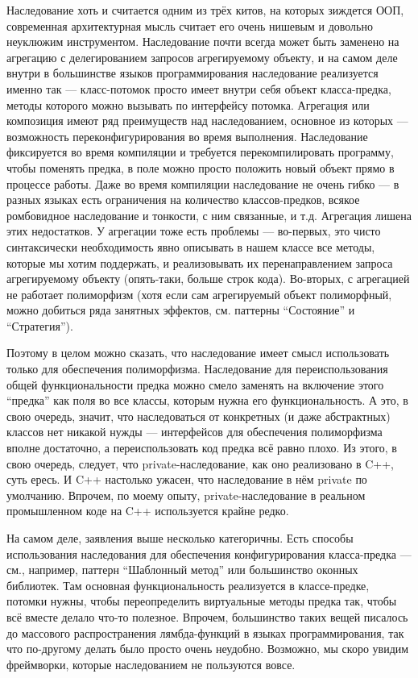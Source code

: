 \documentclass{../../text-style}
\begin{document}
Наследование хоть и считается одним из трёх китов, на которых зиждется ООП, современная архитектурная мысль считает его очень нишевым и довольно неуклюжим инструментом. Наследование почти всегда может быть заменено на агрегацию с делегированием запросов агрегируемому объекту, и на самом деле внутри в большинстве языков программирования наследование реализуется именно так --- класс-потомок просто имеет внутри себя объект класса-предка, методы которого можно вызывать по интерфейсу потомка. Агрегация или композиция имеют ряд преимуществ над наследованием, основное из которых --- возможность переконфигурирования во время выполнения. Наследование фиксируется во время компиляции и требуется перекомпилировать программу, чтобы поменять предка, в поле можно просто положить новый объект прямо в процессе работы. Даже во время компиляции наследование не очень гибко --- в разных языках есть ограничения на количество классов-предков, всякое ромбовидное наследование и тонкости, с ним связанные, и т.д. Агрегация лишена этих недостатков. У агрегации тоже есть проблемы --- во-первых, это чисто синтаксически необходимость явно описывать в нашем классе все методы, которые мы хотим поддержать, и реализовывать их перенаправлением запроса агрегируемому объекту (опять-таки, больше строк кода). Во-вторых, с агрегацией не работает полиморфизм (хотя если сам агрегируемый объект полиморфный, можно добиться ряда занятных эффектов, см. паттерны ``Состояние'' и ``Стратегия'').

Поэтому в целом можно сказать, что наследование имеет смысл использовать только для обеспечения полиморфизма. Наследование для переиспользования общей функциональности предка можно смело заменять на включение этого ``предка'' как поля во все классы, которым нужна его функциональность. А это, в свою очередь, значит, что наследоваться от конкретных (и даже абстрактных) классов нет никакой нужды --- интерфейсов для обеспечения полиморфизма вполне достаточно, а переиспользовать код предка всё равно плохо. Из этого, в свою очередь, следует, что private-наследование, как оно реализовано в C++, суть ересь. И C++ настолько ужасен, что наследование в нём private по умолчанию. Впрочем, по моему опыту, private-наследование в реальном промышленном коде на C++ используется крайне редко.

На самом деле, заявления выше несколько категоричны. Есть способы использования наследования для обеспечения конфигурирования класса-предка --- см., например, паттерн ``Шаблонный метод'' или большинство оконных библиотек. Там основная функциональность реализуется в классе-предке, потомки нужны, чтобы переопределить виртуальные методы предка так, чтобы всё вместе делало что-то полезное. Впрочем, большинство таких вещей писалось до массового распространения лямбда-функций в языках программирования, так что по-другому делать было просто очень неудобно. Возможно, мы скоро увидим фреймворки, которые наследованием не пользуются вовсе.
\end{document}
